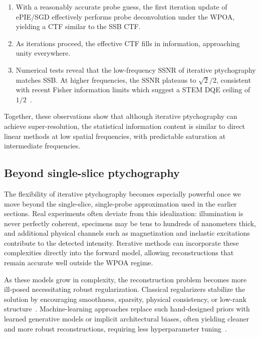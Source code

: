 \documentclass[pdflatex,sn-aps,iicol]{sn-jnl}%
\begin{document}
\begin{enumerate}
\item With a reasonably accurate probe guess, the first iteration update of ePIE/SGD effectively performs probe deconvolution under the WPOA, yielding a CTF similar to the SSB CTF.
\item As iterations proceed, the effective CTF fills in information, approaching unity everywhere.
\item Numerical tests reveal that the low-frequency SSNR of iterative ptychography matches SSB.
At higher frequencies, the SSNR plateaus to $\sqrt{2}/2$, consistent with recent Fisher information limits which suggest a STEM DQE ceiling of $1/2$~\cite{Dwyer_2024,Vega_2025,Varnavides_2025_ssnr}.
\end{enumerate}

Together, these observations show that although iterative ptychography can achieve super-resolution, the statistical information content is similar to direct linear methods at low spatial frequencies, with predictable saturation at intermediate frequencies.

\subsection*{Beyond single-slice ptychography}
\label{sec:beyond-ss}

The flexibility of iterative ptychography becomes especially powerful once we move beyond the single-slice, single-probe approximation used in the earlier sections.
Real experiments often deviate from this idealization: illumination is never perfectly coherent, specimens may be tens to hundreds of nanometers thick, and additional physical channels such as magnetization and inelastic excitations contribute to the detected intensity.
Iterative methods can incorporate these complexities directly into the forward model, allowing reconstructions that remain accurate well outside the WPOA regime.

As these models grow in complexity, the reconstruction problem becomes more ill-posed necessitating robust regularization.
Classical regularizers stabilize the solution by encouraging smoothness, sparsity, physical consistency, or low-rank structure~\cite{Varnavides_2023}.
Machine-learning approaches replace such hand-designed priors with learned generative models or implicit architectural biases, often yielding cleaner and more robust reconstructions, requiring less hyperparameter tuning~\cite{McCray_2025}.
\end{document}
